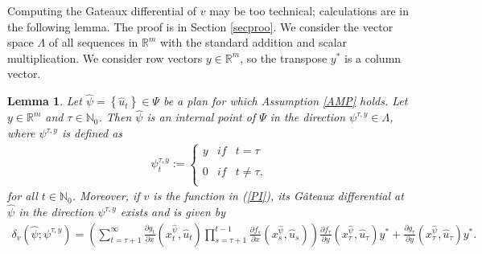 \documentclass[3p]{elsarticle}
\newcommand{\rzm}{\mathbb R^{m}}
\newcommand{\nat}{\mathbb N_0}
\newtheorem{lem}[thm]{Lemma}
\begin{document}
	Computing the Gateaux differential of $v$ may be too  technical; calculations are in the following lemma. The proof is in Section \ref{secproo}.
	We consider the vector space $\Lambda$ of all sequences in $\mathbb R^m$ with the standard addition and scalar multiplication. We consider row vectors $y\in\mathbb R^m$, so the transpose $y^*$ is a column vector.
	\begin{lem}\label{DV}
		Let  $\hat \psi=\left\lbrace \hat u_t\right\rbrace \in \Psi$ be a plan for which Assumption \ref{AMP} holds. Let $y\in\rzm$ and $\tau\in\nat$. Then $\hat\psi$ is an internal point of $\Psi$ in the direction $\psi^{\tau,y}\in\Lambda$, where $\psi^{\tau,y}$ is defined as 
		\begin{align*}
		\psi^{\tau,y}_t:=\left\{ \begin{array}{lcc}
		\displaystyle y &   if  & t=\tau \\
		\\ 0 &  if & t\neq\tau, \\
		\end{array}
		\right.
		\end{align*}
		for all $t\in\nat$. Moreover, if $v$ is the function in (\ref{PI}), its G\^ ateaux differential at $\hat\psi$ in the direction $\psi^{\tau,y}$ exists and is given by 
		\begin{align*}
		\delta_v(\hat\psi;\psi^{\tau,y})= \left( \sum_{t=\tau+1}^\infty\frac{\partial g_t}{\partial x}(x_t^{\hat{\psi}},\hat u_t)\prod_{s=\tau+1}^{t-1}\frac{\partial f_s}{\partial x}(x_s^{\hat{\psi}},\hat u_s)\right)\frac{\partial f_\tau}{\partial y}(x_\tau^{\hat{\psi}},\hat u_\tau)y^*+\frac{\partial g_\tau}{\partial y}(x_\tau^{\hat{\psi}},\hat u_\tau)y^*.
		\end{align*} 
	\end{lem} 
	
\end{document}
